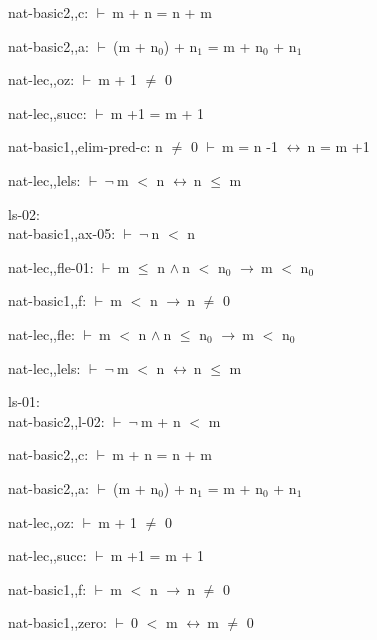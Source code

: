 \documentclass[a4paper]{article}
\newcommand{\Fol}{\mbox{$\vdash\ $}}
\newcommand{\Not}{\mbox{$\neg\ $}}
\newcommand{\And}{\mbox{$\wedge\ $}}
\newcommand{\Imp}{\mbox{$\rightarrow\ $}}
\newcommand{\Equiv}{\mbox{$\leftrightarrow\ $}}
\begin{document}
nat-basic2,,c: 
 \Fol m + n = n + m



nat-basic2,,a: 
 \Fol (m + $\mbox{n}_{0}$) + $\mbox{n}_{1}$ = m + $\mbox{n}_{0}$ + $\mbox{n}_{1}$



nat-lec,,oz: 
 \Fol m + 1 $\neq$ 0



nat-lec,,succ: 
 \Fol m +1 = m + 1



nat-basic1,,elim-pred-c: 
n $\neq$ 0
 \Fol m = n -1 \Equiv n = m +1



nat-lec,,lels: 
 \Fol \Not m $<$ n \Equiv n $\le$ m



\bigskip

ls-02:\\ nat-basic1,,ax-05: 
 \Fol \Not n $<$ n



nat-lec,,fle-01: 
 \Fol m $\le$ n \And n $<$ $\mbox{n}_{0}$ \Imp m $<$ $\mbox{n}_{0}$



nat-basic1,,f: 
 \Fol m $<$ n \Imp n $\neq$ 0



nat-lec,,fle: 
 \Fol m $<$ n \And n $\le$ $\mbox{n}_{0}$ \Imp m $<$ $\mbox{n}_{0}$



nat-lec,,lels: 
 \Fol \Not m $<$ n \Equiv n $\le$ m



\bigskip

ls-01:\\ nat-basic2,,l-02: 
 \Fol \Not m + n $<$ m



nat-basic2,,c: 
 \Fol m + n = n + m



nat-basic2,,a: 
 \Fol (m + $\mbox{n}_{0}$) + $\mbox{n}_{1}$ = m + $\mbox{n}_{0}$ + $\mbox{n}_{1}$



nat-lec,,oz: 
 \Fol m + 1 $\neq$ 0



nat-lec,,succ: 
 \Fol m +1 = m + 1



nat-basic1,,f: 
 \Fol m $<$ n \Imp n $\neq$ 0



nat-basic1,,zero: 
 \Fol 0 $<$ m \Equiv m $\neq$ 0
\end{document}
